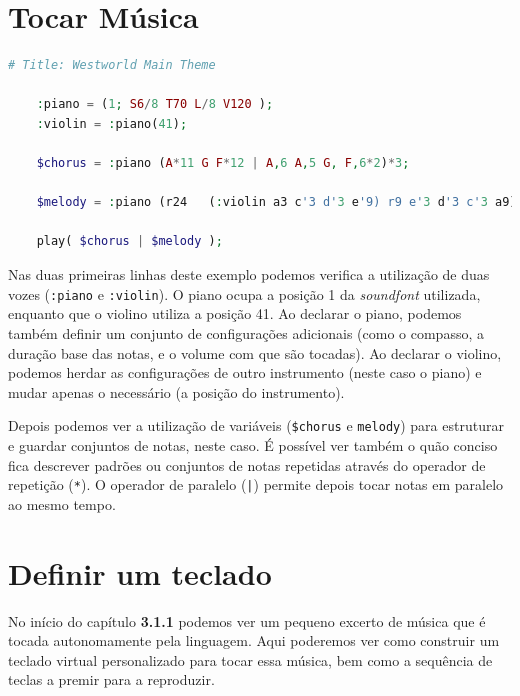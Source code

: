 \documentclass[
  oneside,
  11pt, a4paper,
  footinclude=true,
  headinclude=true,
  cleardoublepage=empty
]{scrbook}
\begin{document}
    \section{Tocar Música}
    \begin{lstlisting}[caption=Exemplo da sintaxe para criação de música,language=PHP]
    # Title: Westworld Main Theme
    
    :piano = (1; S6/8 T70 L/8 V120 );
    :violin = :piano(41);
    
    $chorus = :piano (A*11 G F*12 | A,6 A,5 G, F,6*2)*3;

    $melody = :piano (r24   (:violin a3 c'3 d'3 e'9) r9 e'3 d'3 c'3 a9);

    play( $chorus | $melody );
    \end{lstlisting}
    
    
    Nas duas primeiras linhas deste exemplo podemos verifica a utilização de duas vozes (\texttt{:piano} e \texttt{:violin}). O piano ocupa a posição 1 da \textit{soundfont} utilizada, enquanto que o violino utiliza a posição 41. Ao declarar o piano, podemos também definir um conjunto de configurações adicionais (como o compasso, a duração base das notas, e o volume com que são tocadas). Ao declarar o violino, podemos herdar as configurações de outro instrumento (neste caso o piano) e mudar apenas o necessário (a posição do instrumento).
    
    Depois podemos ver a utilização de variáveis (\texttt{\$chorus} e \texttt{melody}) para estruturar e guardar conjuntos de notas, neste caso.
    É possível ver também o quão conciso fica descrever padrões ou conjuntos de notas repetidas através do operador de repetição (\texttt{*}). O operador de paralelo (\texttt{|}) permite depois tocar notas em paralelo ao mesmo tempo.
    
    \section{Definir um teclado}
    
    No início do capítulo \textbf{3.1.1} podemos ver um pequeno excerto de música que é tocada autonomamente pela linguagem. Aqui poderemos ver como construir um teclado virtual personalizado para tocar essa música, bem como a sequência de teclas a premir para a reproduzir.
        
\end{document}
